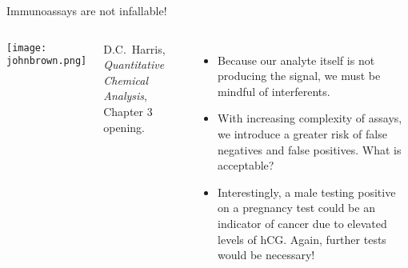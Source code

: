 \documentclass[notes=show]{beamer}
\begin{document}
%
%
%

\clearpage

\begin{frame}{Immunoassays are not infallable!}
	\begin{columns}
		\begin{center}
			\texttt{[image: johnbrown.png]}

		\end{center}
		\footnotesize{D.C.\ Harris, \textit{Quantitative Chemical
		Analysis}, Chapter 3 opening.}
		\begin{itemize}
			\item Because our analyte itself is not producing the
				signal, we must be mindful of interferents.
			\item With increasing complexity of assays, we introduce
				a greater risk of false negatives and false
				positives. What is acceptable?

				\bigskip

			\item Interestingly, a male testing positive on a
				pregnancy test could be an indicator of cancer
				due to elevated levels of hCG. Again, further
				tests would be necessary!
		\end{itemize}
	\end{columns}
\end{frame}
\end{document}
